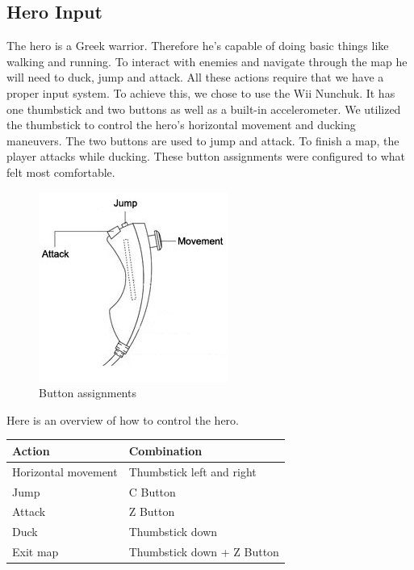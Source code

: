 \subsection*{Hero Input} %
The hero is a Greek warrior. Therefore he's capable of doing basic things like walking and running. To interact with enemies and navigate through the map he will need to duck, jump and attack. All these actions require that we have a proper input system.
\newline
To achieve this, we chose to use the Wii Nunchuk. It has one thumbstick and two buttons as well as a built-in accelerometer. We utilized the thumbstick to control the hero's horizontal movement and ducking maneuvers. The two buttons are used to jump and attack. To finish a map, the player attacks while ducking.
\newline
These button assignments were configured to what felt most comfortable.

\begin{figure}[H]
  \centering
  \includegraphics[scale=0.6]{Figures/nunchuk}
  \caption{Button assignments}
  \label{fig:Nunchuk}
\end{figure}

Here is an overview of how to control the hero.

\begin{table}[H]
    \centering
    \begin{tabular}{ll}
    Action               & Combination                \\ \hline
    Horizontal movement  & Thumbstick left and right  \\
    Jump                 & C Button                   \\
    Attack               & Z Button                   \\
    Duck                 & Thumbstick down            \\
    Exit map             & Thumbstick down + Z Button \\
    \end{tabular}
\end{table}


